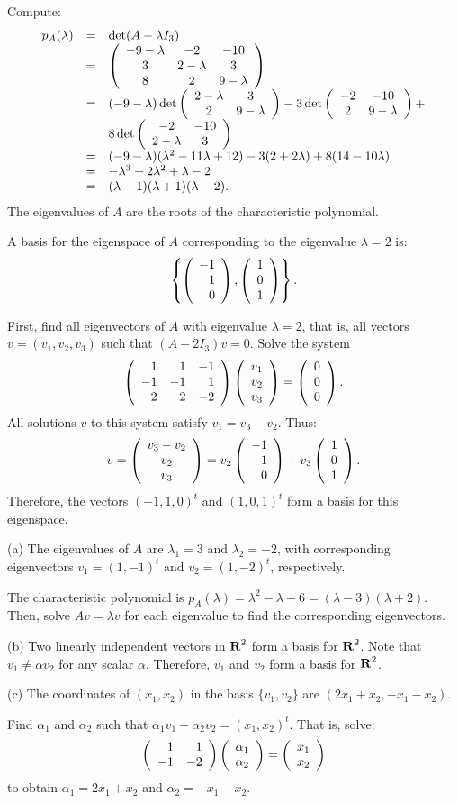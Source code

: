 \soln Compute:
\[
\begin{array}{rcl}
p_A(\lambda) & = & \det(A - \lambda I_3) \\
& = & \left(\begin{array}{ccc} -9 - \lambda & -2 & -10 \\ 3 & 2 - \lambda & 3 \\ 8 & 2 & 9 - \lambda\end{array}\right) \\
& = & (-9 - \lambda)\det\left(\begin{array}{cc} 2 - \lambda & 3\\ 2 &9 - \lambda\end{array}\right)
- 3\det\left(\begin{array}{cc} -2 & -10\\ 2 &9 - \lambda\end{array}\right) + \\
& & 8\det\left(\begin{array}{cc} -2 & -10\\ 2 - \lambda &3\end{array}\right) \\
& = & (-9 - \lambda)(\lambda^2 - 11\lambda + 12)
- 3(2 + 2\lambda) + 8(14 - 10\lambda) \\
& = & -\lambda^3 + 2\lambda^2 + \lambda - 2 \\
& = & (\lambda - 1)(\lambda + 1)(\lambda - 2). \end{array}
\]
The eigenvalues of $A$ are the roots of the characteristic polynomial.

\ans A basis for the eigenspace of $A$ corresponding to the eigenvalue
$\lambda = 2$ is:
\[
\left\{\left(\begin{array}{r} -1 \\ 1 \\ 0\end{array}\right), \left(\begin{array}{r} 1 \\ 0 \\ 1\end{array}\right)\right\}.
\]

\soln First, find all eigenvectors of $A$ with eigenvalue
$\lambda = 2$, that is, all vectors $v = (v_1,v_2,v_3)$ such
that $(A - 2I_3)v = 0$.  Solve the system
\[
\left(\begin{array}{rrr} 1 & 1 & -1 \\ -1 & -1 & 1 \\ 2 & 2 & -2\end{array}\right)\left(\begin{array}{r} v_1 \\ v_2 \\ v_3\end{array}\right) =
\left(\begin{array}{r} 0 \\ 0 \\ 0\end{array}\right).
\]
All solutions $v$ to this system satisfy $v_1 = v_3 - v_2$.  Thus:
\[
v = \left(\begin{array}{c} v_3 - v_2 \\ v_2 \\ v_3\end{array}\right) = v_2\left(\begin{array}{r} -1 \\ 1 \\ 0\end{array}\right) +
v_3\left(\begin{array}{r} 1 \\ 0 \\ 1\end{array}\right).
\]
Therefore, the vectors $(-1,1,0)^t$ and $(1,0,1)^t$ form a basis
for this eigenspace.

(a) \ans The eigenvalues of $A$ are $\lambda_1 = 3$ and $\lambda_2 = -2$,
with corresponding eigenvectors $v_1 = (1,-1)^t$ and
$v_2 = (1,-2)^t$, respectively.

\soln The characteristic polynomial is $p_A(\lambda) =
\lambda^2 - \lambda - 6 = (\lambda - 3)(\lambda + 2)$.  Then, solve
$Av = \lambda v$ for each eigenvalue to find the corresponding eigenvectors.

(b) Two linearly independent vectors in $\mbox{$\bf{R}$}^2$ form a basis for $\mbox{$\bf{R}$}^2$.
Note that $v_1 \neq \alpha v_2$ for any scalar $\alpha$.  Therefore,
$v_1$ and $v_2$ form a basis for $\mbox{$\bf{R}$}^2$.

(c) \ans The coordinates of $(x_1,x_2)$ in the basis $\{v_1,v_2\}$ are
$(2x_1 + x_2, -x_1 - x_2)$. 

\soln Find $\alpha_1$ and $\alpha_2$ such that $\alpha_1v_1 +
\alpha_2v_2 = (x_1,x_2)^t$.  That is, solve:
\[
\left(\begin{array}{rr} 1 & 1\\ -1 &-2\end{array}\right)\left(\begin{array}{r} \alpha_1 \\ \alpha_2\end{array}\right) = \left(\begin{array}{r} x_1 \\ x_2\end{array}\right)
\]
to obtain $\alpha_1 = 2x_1 + x_2$ and $\alpha_2 = -x_1 - x_2$.


